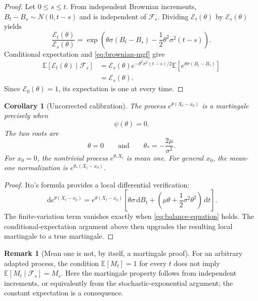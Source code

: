 \documentclass[10pt,a4paper]{article}
\numberwithin{equation}{section}
\theoremstyle{blueplain}
\newtheorem{corollary}[theorem]{Corollary}
\theoremstyle{definition}
\newtheorem{remark}[theorem]{Remark}
\newcommand{\E}{\mathbb E}
\newcommand{\F}{\mathcal F}
\newcommand{\dd}{\,\mathrm d}
\begin{document}
\begin{proof}
Let \(0\le s\le t\).  From independent Brownian increments,
\(B_t-B_s\sim N(0,t-s)\) and is independent of \(\F_s\).  Dividing
\(\mathcal E_t(\theta)\) by \(\mathcal E_s(\theta)\) yields
\[
  \frac{\mathcal E_t(\theta)}{\mathcal E_s(\theta)}
  =\exp\!\left(
      \theta\sigma(B_t-B_s)
      -\frac12\theta^2\sigma^2(t-s)
    \right).
\]
Conditional expectation and \eqref{eq:brownian-mgf} give
\begin{align}
  \E[\mathcal E_t(\theta)\mid\F_s]
  &=\mathcal E_s(\theta)
    e^{-\theta^2\sigma^2(t-s)/2}
    \E[e^{\theta\sigma(B_t-B_s)}]\\
  &=\mathcal E_s(\theta).
\end{align}
Since \(\mathcal E_0(\theta)=1\), its expectation is one at every time.
\end{proof}

\begin{corollary}[Uncorrected calibration]
The process \(e^{\theta(X_t-x_0)}\) is a martingale precisely when
\begin{equation}
  \psi(\theta)=0.
  \label{eq:balance-equation}
\end{equation}
The two roots are
\begin{equation}
  \theta=0
  \qquad\text{and}\qquad
  \boxed{\theta_*=-\frac{2\mu}{\sigma^2}}.
  \label{eq:theta-star}
\end{equation}
For \(x_0=0\), the nontrivial process \(e^{\theta_*X_t}\) is mean one.
For general \(x_0\), the mean-one normalization is
\(e^{\theta_*(X_t-x_0)}\).
\end{corollary}

\begin{proof}
Ito's formula provides a local differential verification:
\begin{equation}
  \dd e^{\theta(X_t-x_0)}
  =e^{\theta(X_t-x_0)}
   \left[
     \theta\sigma\dd B_t
     +\left(\mu\theta+\frac12\sigma^2\theta^2\right)\dd t
   \right].
  \label{eq:ito-exponential}
\end{equation}
The finite-variation term vanishes exactly when \eqref{eq:balance-equation}
holds.  The conditional-expectation argument above then upgrades the resulting
local martingale to a true martingale.
\end{proof}

\begin{remark}[Mean one is not, by itself, a martingale proof]
For an arbitrary adapted process, the condition \(\E[M_t]=1\) for every \(t\)
does not imply \(\E[M_t\mid\F_s]=M_s\).  Here the martingale property follows
from independent increments, or equivalently from the stochastic-exponential
argument; the constant expectation is a consequence.
\end{remark}
\end{document}

